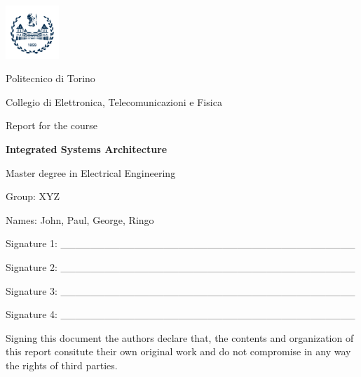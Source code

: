 \documentclass[10pt,  english, makeidx, a4paper, titlepage, oneside]{book}
\begin{document}
\frontmatter
\begin{titlepage}
\vspace{2cm}
\centerline{
\includegraphics[width=2cm]{./logopoli_new}}  
\centerline{\LARGE Politecnico di Torino}
\bigskip
\centerline{\Large Collegio di Elettronica, Telecomunicazioni e Fisica}
\vspace{3cm}
\centerline{\Huge\sf Report for the course}
\bigskip
\centerline{\Huge\bfseries\sf Integrated Systems Architecture}
\vspace{2cm}
\centerline{\LARGE Master degree in Electrical Engineering}
\vspace{2cm}
%
\centerline{\Large Group: XYZ}
\vspace{1cm}
%
%
\centerline{Names: John, Paul, George, Ringo}
\vspace{1cm}
\centerline{Signature 1: \_\_\_\_\_\_\_\_\_\_\_\_\_\_\_\_\_\_\_\_\_\_\_\_\_\_\_\_\_\_\_\_\_\_\_\_\_\_\_\_}
\vspace{1cm}
\centerline{Signature 2: \_\_\_\_\_\_\_\_\_\_\_\_\_\_\_\_\_\_\_\_\_\_\_\_\_\_\_\_\_\_\_\_\_\_\_\_\_\_\_\_}
\vspace{1cm}
\centerline{Signature 3: \_\_\_\_\_\_\_\_\_\_\_\_\_\_\_\_\_\_\_\_\_\_\_\_\_\_\_\_\_\_\_\_\_\_\_\_\_\_\_\_}
\vspace{1cm}
\centerline{Signature 4: \_\_\_\_\_\_\_\_\_\_\_\_\_\_\_\_\_\_\_\_\_\_\_\_\_\_\_\_\_\_\_\_\_\_\_\_\_\_\_\_}
%
\vspace{1cm}
Signing this document the authors declare that, the contents and organization of this report consitute their own original work and do not compromise in any way the rights of third parties.
\end{titlepage}

\tableofcontents

% 
\mainmatter
\lstset{language=VHDL}


\end{document}
